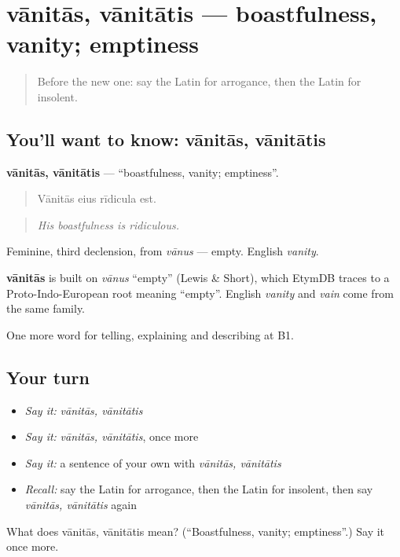 \section[vānitās, vānitātis]{vānitās, vānitātis — boastfulness, vanity; emptiness}

\label{lesson:LA-C507-vanitas}



\begin{quote}
Before the new one: say the Latin for arrogance, then the Latin for insolent.
\end{quote}

\subsection*{You'll want to know: vānitās, vānitātis}
\textbf{vānitās, vānitātis} — \textquotedblleft{}boastfulness, vanity; emptiness\textquotedblright{}.

\begin{quote}
Vānitās eius rīdicula est.
\end{quote}

\begin{quote}
\emph{His boastfulness is ridiculous.}
\end{quote}

Feminine, third declension, from \emph{vānus} — empty. English \emph{vanity}.

\begin{cousinweb}
\textbf{vānitās} is built on \emph{vānus} \textquotedblleft{}empty\textquotedblright{} (Lewis \& Short), which EtymDB traces to a Proto-Indo-European root meaning \textquotedblleft{}empty\textquotedblright{}. English \emph{vanity} and \emph{vain} come from the same family.
\end{cousinweb}

\begin{grammarlens}[title={What you've built}]
One more word for telling, explaining and describing at B1.
\end{grammarlens}

\subsection*{Your turn}
\begin{itemize}
\raggedright
  \item \emph{Say it:} \emph{vānitās, vānitātis}
  \item \emph{Say it:} \emph{vānitās, vānitātis}, once more
  \item \emph{Say it:} a sentence of your own with \emph{vānitās, vānitātis}
  \item \emph{Recall:} say the Latin for arrogance, then the Latin for insolent, then say \emph{vānitās, vānitātis} again
\end{itemize}

\begin{tcolorbox}[breakable,colback=teal!4,colframe=teal!35!black,title={Before you move on}]
What does vānitās, vānitātis mean? (\textquotedblleft{}Boastfulness, vanity; emptiness\textquotedblright{}.) Say it once more.
\end{tcolorbox}
